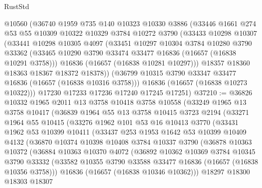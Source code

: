 \begin{lexlean}{RustStd}
\begin{coremodule}
    @10560
    (@36740
      @1959
      @735
      @140
      @10323
      @10330
      @3886
      (@33446
        @1661
        @274
        @53
        @55
        @10309
        @10322
        @10329
        @3784
        @10272
        @3790
        (@33433
          @10298
          @10307
          (@33441
            @10298
            @10305
            @4097
            (@33451
              @10297
              @10304
              @3784
              @10280
              @3790
              @33362
              (@33465 @10290 @3790 @33474 @33477 @16836 (@16657 (@16838 @10291 @3758)))
              @16836
              (@16657 (@16838 @10281 @10297)))
            @18357
            @18360
            @18363
            @18367
            @18372
            @18378))
        (@36799 @10315 @3790 @33347 @33477 @16836 (@16657 (@16838 @10316 @3758)))
        @16836
        (@16657 (@16838 @10273 @10322)))
      @17230
      @17233
      @17236
      @17240
      @17245
      @17251)
@37210 := @36826
    @10332
    @1965
    @2011
    @13
    @3758
    @10418
    @3758
    @10558
    (@33249
      @1965
      @13
      @3758
      @10417
      (@36839
        @1964
        @55
        @13
        @3758
        @10415
        @3723
        @2194
        (@33271
          @1964
          @55
          @10415
          (@33276
            @1962
            @101
            @53
            @16
            @10413
            @3770
            (@33431
              @1962
              @53
              @10399
              @10411
              (@33437
                @253
                @1953
                @1642
                @53
                @10399
                @10409
                @4132
                (@36870
                  @10374
                  @10398
                  @10408
                  @3784
                  @10337
                  @3790
                  (@36878
                    @10363
                    @10372
                    (@36884
                      @10363
                      @10370
                      @4072
                      (@36892
                        @10362
                        @10369
                        @3784
                        @10345
                        @3790
                        @33332
                        (@33582 @10355 @3790 @33588 @33477 @16836 (@16657 (@16838 @10356 @3758)))
                        @16836
                        (@16657 (@16838 @10346 @10362)))
                      @18297
                      @18300
                      @18303
                      @18307

\end{coremodule}
\end{lexlean}
